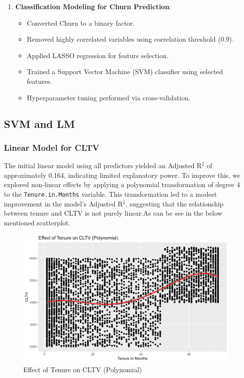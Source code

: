 \documentclass[
]{article}
\providecommand{\tightlist}{%
  \setlength{\itemsep}{0pt}\setlength{\parskip}{0pt}}
\begin{document}
\begin{enumerate}
\def\labelenumi{\arabic{enumi}.}
\setcounter{enumi}{1}
\tightlist
\item
  \textbf{Classification Modeling for Churn Prediction}:

  \begin{itemize}
  \tightlist
  \item
    Converted Churn to a binary factor.
  \item
    Removed highly correlated variables using correlation threshold
    (0.9).
  \item
    Applied LASSO regression for feature selection.
  \item
    Trained a Support Vector Machine (SVM) classifier using selected
    features.
  \item
    Hyperparameter tuning performed via cross-validation.
  \end{itemize}
\end{enumerate}

\hypertarget{svm-and-lm}{%
\subsection{SVM and LM}\label{svm-and-lm}}

\hypertarget{linear-model-for-cltv}{%
\subsubsection{Linear Model for CLTV}\label{linear-model-for-cltv}}

The initial linear model using all predictors yielded an Adjusted
R\(^2\) of approximately 0.164, indicating limited explanatory power. To
improve this, we explored non-linear effects by applying a polynomial
transformation of degree 4 to the \texttt{Tenure.in.Months} variable.
This transformation led to a modest improvement in the model's Adjusted
R\(^2\), suggesting that the relationship between tenure and CLTV is not
purely linear.As can be see in the below mentioned scatterplot.

\begin{figure}

{\centering \includegraphics[width=0.85\linewidth]{Plots/cltv_vs_tenure} 

}

\caption{Effect of Tenure on CLTV (Polynomial)}\label{fig:cltv-vs-tenure-img}
\end{figure}
\end{document}
